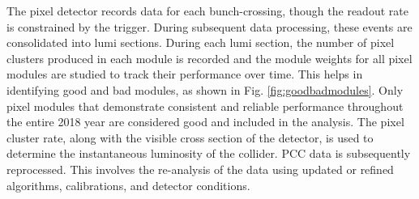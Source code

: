 The pixel detector records data for each bunch-crossing, though the readout rate is constrained by the trigger. During subsequent data processing,  these events are consolidated into lumi sections. During each lumi section, the number of pixel clusters produced in each module is recorded and the module weights for all pixel modules are studied to track their performance over time. This helps in identifying good and bad modules, as shown in Fig. \ref{fig:goodbadmodules}. Only pixel modules that demonstrate consistent and reliable performance throughout the entire 2018 year are considered good and included in the analysis. The pixel cluster rate, along with the visible cross section of the detector, is used to determine the instantaneous luminosity of the collider. PCC data is subsequently reprocessed. This involves the re-analysis of the data using updated or refined algorithms, calibrations, and detector conditions.

